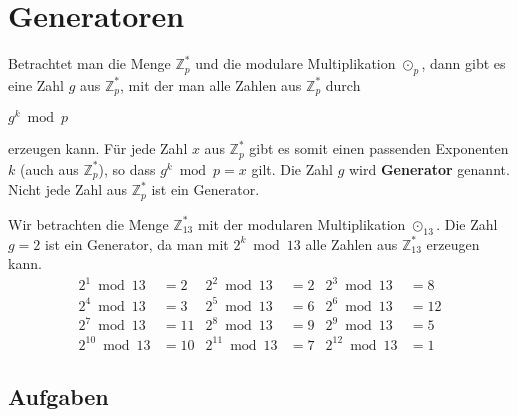 \section{Generatoren}

Betrachtet man die Menge $\mathbb{Z}_p^*$ und die modulare Multiplikation $\odot_{p}$, dann gibt es eine Zahl $g$ aus $\mathbb{Z}_p^*$, mit der man alle Zahlen aus $\mathbb{Z}_p^*$ durch

\begin{center}
	$g^k \bmod p$
\end{center}

erzeugen kann. Für jede Zahl $x$ aus $\mathbb{Z}_p^*$ gibt es somit einen passenden Exponenten $k$ (auch aus $\mathbb{Z}_p^*$), so dass $g^k \bmod p = x$ gilt. Die Zahl $g$ wird \textbf{Generator} genannt. Nicht jede Zahl aus $\mathbb{Z}_p^*$ ist ein Generator.

\newpage

\begin{example}
	Wir betrachten die Menge $\mathbb{Z}_{13}^*$ mit der modularen Multiplikation $\odot_{13}$. Die Zahl 
	$g = 2$ ist ein Generator, da man mit $2^k \bmod 13$ alle Zahlen aus $\mathbb{Z}_{13}^*$ erzeugen kann.
	\begin{align*}
		2^{1} \bmod 13 &= 2 & 2^{2} \bmod 13 &= 2 & 2^{3} \bmod 13 &= 8 \\
		2^{4} \bmod 13  &= 3 & 2^{5} \bmod 13 &= 6 & 2^{6} \bmod 13 &= 12 \\
		2^{7} \bmod 13 &= 11 & 2^{8} \bmod 13 &= 9 & 2^{9} \bmod 13 &= 5 \\
		2^{10} \bmod 13 &= 10 & 2^{11} \bmod 13 &= 7 & 2^{12} \bmod 13 &= 1
	\end{align*}
\end{example}

\subsection{Aufgaben}


